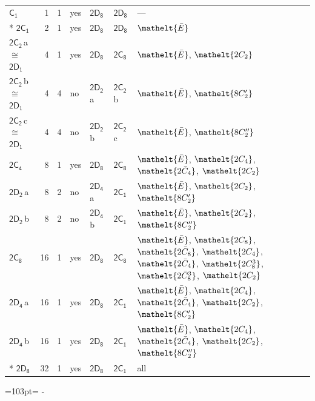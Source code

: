 \documentclass[10pt,a4paper]{article}
\newcommand{\needspace}[1]{\par\penalty-100\begingroup\dimen0=#1\relax\dimen2=\pagegoal
  \advance\dimen2-\pagetotal\ifdim\dimen0>\dimen2\relax\ifdim\dimen2>0pt\vfil\break\fi\fi
  \endgroup}
\numberwithin{equation}{section}
\newcommand{\eltfont}[1]{{\let\sigma\eltsigma\mathelt{#1}}}
\newcommand{\grp}[1]{\mathsf{#1}}
\newcommand{\cls}[1]{\eltfont{#1}}
\newcommand{\samecls}{\cong}
\newcommand{\clsletter}[1]{\,{\scriptsize\color{black!55}#1}}
\newcommand{\barred}[1]{\bar{#1}}
\newlength{\fillwidth}\newlength{\cellwidth}\newlength{\colwidth}
\begin{document}
{\begin{longtable}{@{}lrrlll>{\RaggedRight\arraybackslash}p{\fillwidth}@{}}
\bottomrule\endfoot\endlastfoot
\href{C1.pdf}{$\grp{C_{1}}$} & 1 & 1 & yes & \href{2D8.pdf}{$\grp{2D_{8}}$} & \href{2D8.pdf}{$\grp{2D_{8}}$} & ---\\*
\href{2C1.pdf}{$\grp{2C_{1}}$} & 2 & 1 & yes & \href{2D8.pdf}{$\grp{2D_{8}}$} & \href{2D8.pdf}{$\grp{2D_{8}}$} & $\cls{\barred{E}}$\\
\href{2C2.pdf}{$\grp{2C_{2}}$}\clsletter{a} $\samecls$ \href{2D1.pdf}{$\grp{2D_{1}}$} & 4 & 1 & yes & \href{2D8.pdf}{$\grp{2D_{8}}$} & \href{2C8.pdf}{$\grp{2C_{8}}$} & $\cls{\barred{E}}$, $\cls{2C_{2}}$\\
\href{2C2.pdf}{$\grp{2C_{2}}$}\clsletter{b} $\samecls$ \href{2D1.pdf}{$\grp{2D_{1}}$} & 4 & 4 & no & \href{2D2.pdf}{$\grp{2D_{2}}$}\clsletter{a} & \href{2C2.pdf}{$\grp{2C_{2}}$}\clsletter{b} & $\cls{\barred{E}}$, $\cls{8C_{2}'}$\\
\href{2C2.pdf}{$\grp{2C_{2}}$}\clsletter{c} $\samecls$ \href{2D1.pdf}{$\grp{2D_{1}}$} & 4 & 4 & no & \href{2D2.pdf}{$\grp{2D_{2}}$}\clsletter{b} & \href{2C2.pdf}{$\grp{2C_{2}}$}\clsletter{c} & $\cls{\barred{E}}$, $\cls{8C_{2}''}$\\
\href{2C4.pdf}{$\grp{2C_{4}}$} & 8 & 1 & yes & \href{2D8.pdf}{$\grp{2D_{8}}$} & \href{2C8.pdf}{$\grp{2C_{8}}$} & $\cls{\barred{E}}$, $\cls{2C_{4}}$, $\cls{2\barred{C}_{4}}$, $\cls{2C_{2}}$\\
\href{2D2.pdf}{$\grp{2D_{2}}$}\clsletter{a} & 8 & 2 & no & \href{2D4.pdf}{$\grp{2D_{4}}$}\clsletter{a} & \href{2C1.pdf}{$\grp{2C_{1}}$} & $\cls{\barred{E}}$, $\cls{2C_{2}}$, $\cls{8C_{2}'}$\\
\href{2D2.pdf}{$\grp{2D_{2}}$}\clsletter{b} & 8 & 2 & no & \href{2D4.pdf}{$\grp{2D_{4}}$}\clsletter{b} & \href{2C1.pdf}{$\grp{2C_{1}}$} & $\cls{\barred{E}}$, $\cls{2C_{2}}$, $\cls{8C_{2}''}$\\
\href{2C8.pdf}{$\grp{2C_{8}}$} & 16 & 1 & yes & \href{2D8.pdf}{$\grp{2D_{8}}$} & \href{2C8.pdf}{$\grp{2C_{8}}$} & $\cls{\barred{E}}$, $\cls{2C_{8}}$, $\cls{2\barred{C}_{8}}$, $\cls{2C_{4}}$, $\cls{2\barred{C}_{4}}$, $\cls{2C_{8}^{3}}$, $\cls{2\barred{C}_{8}^{3}}$, $\cls{2C_{2}}$\\
\href{2D4.pdf}{$\grp{2D_{4}}$}\clsletter{a} & 16 & 1 & yes & \href{2D8.pdf}{$\grp{2D_{8}}$} & \href{2C1.pdf}{$\grp{2C_{1}}$} & $\cls{\barred{E}}$, $\cls{2C_{4}}$, $\cls{2\barred{C}_{4}}$, $\cls{2C_{2}}$, $\cls{8C_{2}'}$\\
\href{2D4.pdf}{$\grp{2D_{4}}$}\clsletter{b} & 16 & 1 & yes & \href{2D8.pdf}{$\grp{2D_{8}}$} & \href{2C1.pdf}{$\grp{2C_{1}}$} & $\cls{\barred{E}}$, $\cls{2C_{4}}$, $\cls{2\barred{C}_{4}}$, $\cls{2C_{2}}$, $\cls{8C_{2}''}$\\*
\href{2D8.pdf}{$\grp{2D_{8}}$} & 32 & 1 & yes & \href{2D8.pdf}{$\grp{2D_{8}}$} & \href{2C1.pdf}{$\grp{2C_{1}}$} & all\\
\bottomrule\end{longtable}}
\needspace{103pt}
\end{document}

